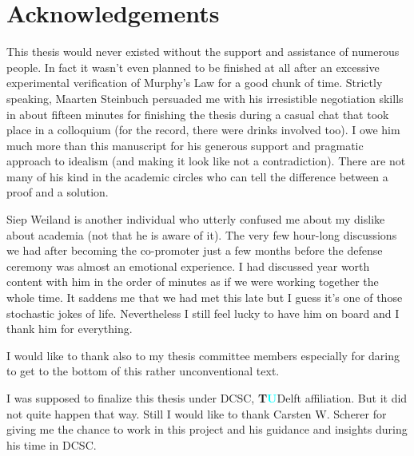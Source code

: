 \chapter{Acknowledgements}

This thesis would never existed without the support and assistance of numerous people. In fact it wasn't even planned to be 
finished at all after an excessive experimental verification of Murphy's Law for a good chunk of time. Strictly speaking, Maarten Steinbuch 
persuaded me with his irresistible negotiation skills in about fifteen minutes for finishing the thesis during a casual chat that took 
place in a colloquium (for the record, there were drinks involved too). I owe him much more than this manuscript for his generous support 
and pragmatic approach to idealism (and making it look like not a contradiction). There are not many of his kind in the academic circles 
who can tell the difference between a proof and a solution.

Siep Weiland is another individual who utterly confused me about my dislike about academia (not that he is aware of it). The very few
hour-long discussions we had after becoming the co-promoter just a few months before the defense ceremony was almost an emotional 
experience. I had discussed year worth content with him in the order of minutes as if we were working together the whole time. It saddens 
me that we had met this late but I guess it's one of those stochastic jokes of life. Nevertheless I still feel lucky to have him on board 
and I thank him for everything. 

I would like to thank also to my thesis committee members especially for daring to get to the bottom of this rather unconventional text. 

I was supposed to finalize this thesis under DCSC, \textsf{\textbf{T\textcolor{cyan}{U}}Delft} affiliation. But it did not quite happen that 
way. Still I would like to thank Carsten W. Scherer for giving me the chance to work in this project and his guidance and insights during 
his time in DCSC. 

